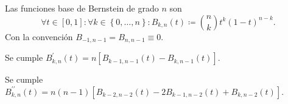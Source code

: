 \begin{frame}
    \begin{definition}
        Las funciones base de Bernstein de grado $n$ son
        \begin{equation*}
            \forall t\in\left[0,1\right]:
            \forall k\in\left\{0,\dotsc,n\right\}:
            B_{k,n}\left(t\right)\coloneqq
            \binom{n}{k}
            t^{k}
            \left(1-t\right)^{n-k}.
        \end{equation*}
        Con la convención
        \begin{math}
            B_{-1,n-1}=
            B_{n,n-1}\equiv0
        \end{math}.
    \end{definition}

    \begin{theorem}
        Se cumple
        \begin{math}
            B^{\prime}_{k,n}\left(t\right)=
            n
            \left[
                B_{k-1,n-1}\left(t\right)-
                B_{k,n-1}\left(t\right)
                \right]
        \end{math}.
    \end{theorem}

    \begin{corollary}
        Se cumple
        \begin{math}
            B^{\prime\prime}_{k,n}\left(t\right)=
            n\left(n-1\right)
            \left[
                B_{k-2,n-2}\left(t\right)-
                2B_{k-1,n-2}\left(t\right)+
                B_{k,n-2}\left(t\right)
                \right]
        \end{math}.
    \end{corollary}


\end{frame}
